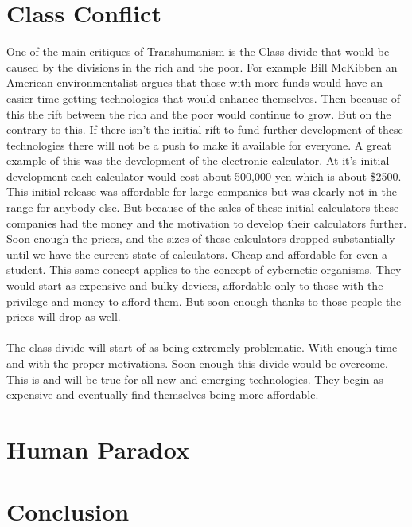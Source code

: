 \documentclass[12pt,a4paper,notitlepage]{article}
\begin{document}
\section{Class Conflict}
One of the main critiques of Transhumanism is the Class divide that would be
caused by the divisions in the rich and the poor. For example Bill McKibben an
American environmentalist argues that those with more funds would have an easier
time getting technologies that would enhance themselves. Then because of this
the rift between the rich and the poor would continue to grow. But on the
contrary to this. If there isn't the initial rift to fund further development of
these technologies there will not be a push to make it available for everyone. A
great example of this was the development of the electronic calculator. At it's
initial development each calculator would cost about 500,000 yen which is about
\$2500. This initial release was affordable for large companies but was clearly
not in the range for anybody else. But because of the sales of these initial
calculators these companies had the money and the motivation to develop their
calculators further. Soon enough the prices, and the sizes of these calculators
dropped substantially until we have the current state of calculators. Cheap and
affordable for even a student. This same concept applies to the concept of
cybernetic organisms. They would start as expensive and bulky devices,
affordable only to those with the privilege and money to afford them. But soon
enough thanks to those people the prices will drop as well.
\\\\
The class divide will start of as being extremely problematic. With enough time
and with the proper motivations. Soon enough this divide would be overcome. This
is and will be true for all new and emerging technologies. They begin as
expensive and eventually find themselves being more affordable.

\section{Human Paradox}



\section{Conclusion}
\end{document}
